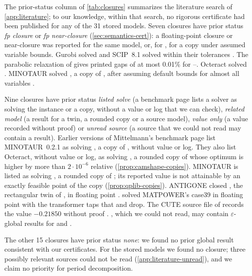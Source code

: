 The prior-status column of \cref{tab:closures} summarizes the literature search of \cref{app:literature}; to our knowledge, within that search, no rigorous certificate had been published for any of the 31 stored models.
Seven closures have prior status \emph{fp closure} or \emph{fp near-closure} (\cref{sec:semantics-cert}): a floating-point closure or near-closure was reported for the same model, or, for , for a copy under assumed variable bounds.
Gurobi solved  and SCIP~8.1 solved  within their tolerances \citep{go2026-parabolic-approximation-relaxation-for-minlp,go2026-publisher-correction-parabolic-approximation-relaxation}.
The parabolic relaxation of \citet{go2026-clash-of-minlp-relaxations-piecewise} gives printed gaps of at most 0.01\% for --.
Octeract solved  \citep{bestuzheva2025-global-optimization-of-mixed-integer}.
MINOTAUR solved , a copy of , after assuming default bounds for almost all variables \citep{mittelmann2026-continuous-non-convex-qplib-benchmark}.

Nine closures have prior status \emph{listed solve} (a benchmark page lists a solver as solving the instance or a copy, without a value or log that we can check), \emph{related model} (a result for a twin, a rounded copy or a source model), \emph{value only} (a value recorded without proof) or \emph{unread source} (a source that we could not read may contain a result).
Earlier versions of Mittelmann's benchmark page list MINOTAUR~0.2.1 as solving , a copy of , without value or log.
They also list Octeract, without value or log, as solving , a rounded copy of  whose optimum is higher by more than $2\cdot10^{-6}$ relative (\cref{prop:camshape-copies}).
MINOTAUR is listed as solving , a rounded copy of ; its reported value is not attainable by an exactly feasible point of the copy (\cref{prop:qplib-copies}).
ANTIGONE closed , the rectangular twin of , in floating point \citep{vigerske2026-minlplib-a-library-of-mixed}.
 solved MATPOWER's case39 in floating point with the transformer taps that  and  drop.
The CUTE source file of  records the value $-0.21850$ without proof \citep{toint2013-cute-hvycrash-source-sif-files}.
, which we could not read, may contain $\varepsilon$-global results for  and .

The other 15 closures have prior status \emph{none}: we found no prior global result consistent with our certificates.
For the stored  models we found no closure; three possibly relevant sources could not be read (\cref{app:literature-unread}), and we claim no priority for period decomposition.
